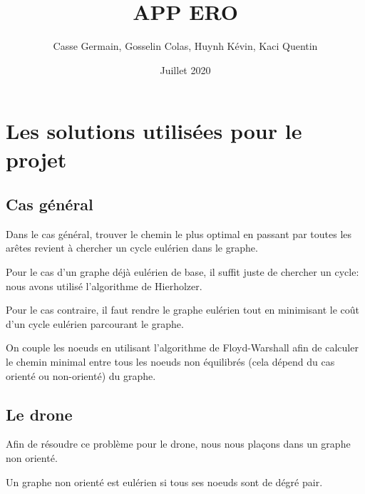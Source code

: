 \documentclass{article}
\title{APP ERO}
\date{Juillet 2020}
\begin{document}
\author{Casse Germain, Gosselin Colas, Huynh Kévin, Kaci Quentin}

\maketitle

\vspace{3cm}

\renewcommand{\contentsname}{Table des matières}

\tableofcontents

\newpage

\section{Les solutions utilisées pour le projet}

\subsection{Cas général}

Dans le cas général, trouver le chemin le plus optimal en passant par toutes les arêtes revient à chercher un cycle eulérien dans le graphe.

\newline

Pour le cas d'un graphe déjà eulérien de base, il suffit juste de chercher un cycle: nous avons utilisé l'algorithme de Hierholzer.

\newline

Pour le cas contraire, il faut rendre le graphe eulérien tout en minimisant le coût d'un cycle eulérien parcourant le graphe.

On couple les noeuds en utilisant l'algorithme de Floyd-Warshall afin de calculer le chemin minimal entre tous les noeuds non équilibrés (cela dépend du cas orienté ou non-orienté) du graphe.



\subsection{Le drone}

Afin de résoudre ce problème pour le drone, nous nous plaçons dans un graphe non orienté. 

\newline

Un graphe non orienté est eulérien si tous ses noeuds sont de dégré pair.
\end{document}
